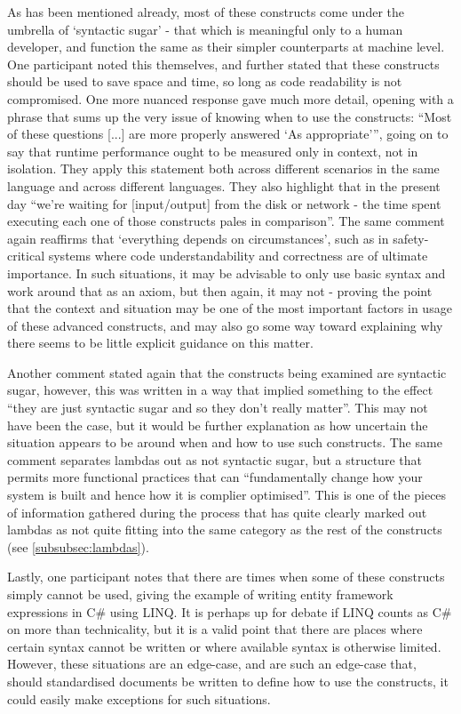 \documentclass{article}
\begin{document}
            As has been mentioned already, most of these constructs come under the umbrella of `syntactic sugar' - that which is meaningful only to a human developer, and function the same as their simpler counterparts at machine level. One participant noted this themselves, and further stated that these constructs should be used to save space and time, so long as code readability is not compromised. One more nuanced response gave much more detail, opening with a phrase that sums up the very issue of knowing when to use the constructs: ``Most of these questions [...] are more properly answered `As appropriate''', going on to say that runtime performance ought to be measured only in context, not in isolation. They apply this statement both across different scenarios in the same language and across different languages. They also highlight that in the present day ``we're waiting for [input/output] from the disk or network - the time spent executing each one of those constructs pales in comparison''. The same comment again reaffirms that `everything depends on circumstances', such as in safety-critical systems where code understandability and correctness are of ultimate importance. In such situations, it may be advisable to only use basic syntax and work around that as an axiom, but then again, it may not - proving the point that the context and situation may be one of the most important factors in usage of these advanced constructs, and may also go some way toward explaining why there seems to be little explicit guidance on this matter.

            Another comment stated again that the constructs being examined are syntactic sugar, however, this was written in a way that implied something to the effect ``they are just syntactic sugar and so they don't really matter''. This may not have been the case, but it would be further explanation as how uncertain the situation appears to be around when and how to use such constructs. The same comment separates lambdas out as not syntactic sugar, but a structure that permits more functional practices that can ``fundamentally change how your system is built and hence how it is complier optimised''. This is one of the pieces of information gathered during the process that has quite clearly marked out lambdas as not quite fitting into the same category as the rest of the constructs (see \ref{subsubsec:lambdas}).

            Lastly, one participant notes that there are times when some of these constructs simply cannot be used, giving the example of writing entity framework expressions in C\# using LINQ. It is perhaps up for debate if LINQ counts as C\# on more than technicality, but it is a valid point that there are places where certain syntax cannot be written or where available syntax is otherwise limited. However, these situations are an edge-case, and are such an edge-case that, should standardised documents be written to define how to use the constructs, it could easily make exceptions for such situations.
\end{document}
